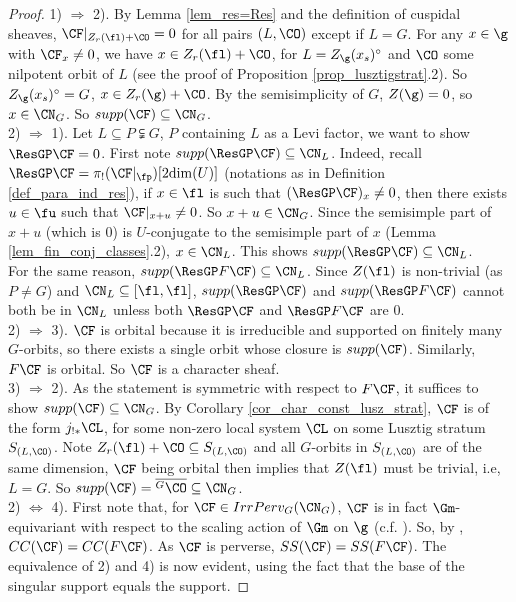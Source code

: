 \begin{proof}
    1) $\Rightarrow$ 2). By Lemma \ref{lem_res=Res} and the definition of cuspidal sheaves, $\CF|_{Z_r(\fl)+\CO}=0$ for all pairs $(L,\CO)$ except if $L=G$. For any $x\in\g$ with $\CF_x\neq 0$, we have $x\in Z_r(\fl)+\CO$, for $L=Z_\g(x_s)^\circ$ and $\CO$ some nilpotent orbit of $L$ (see the proof of Proposition \ref{prop_lusztigstrat}.2). So $Z_\g(x_s)^\circ=G$, $x\in Z_r(\g)+\CO$. By the semisimplicity of $G$, $Z(\g)=0$, so $x\in\CN_G$. So $supp(\CF)\subseteq\CN_G$.\\
    
    2) $\Rightarrow$ 1). Let $L\subseteq P\subsetneqq G$, $P$ containing $L$ as a Levi factor, we want to show $\ResGP\CF=0$. First note $supp(\ResGP\CF)\subseteq \CN_L$. Indeed, recall $\ResGP\CF=\pi_!(\CF|_\fp)[2\mathrm{dim}(U)]$ (notations as in Definition \ref{def_para_ind_res}), if $x\in \fl$ is such that $(\ResGP\CF)_x\neq 0$, then there exists $u\in\fu$ such that $\CF|_{x+u}\neq 0$. So $x+u\in \CN_G$. Since the semisimple part of $x+u$ (which is 0) is $U$-conjugate to the semisimple part of $x$ (Lemma \ref{lem_fin_conj_classes}.2), $x\in \CN_L$. This shows $supp(\ResGP\CF)\subseteq \CN_L$.\\

    For the same reason, $supp(\ResGP F\CF)\subseteq \CN_L$. Since $Z(\fl)$ is non-trivial (as $P\neq G$) and $\CN_L\subseteq [\fl,\fl]$, $supp(\ResGP\CF)$ and $supp(\ResGP F\CF)$ cannot both be in $\CN_L$ unless both $\ResGP\CF$ and $\ResGP F\CF$ are 0.\\
    
    2) $\Rightarrow$ 3). $\CF$ is orbital because it is irreducible and supported on finitely many $G$-orbits, so there exists a single orbit whose closure is $supp(\CF)$. Similarly, $F\CF$ is orbital. So $\CF$ is a character sheaf.\\
    
    3) $\Rightarrow$ 2). As the statement is symmetric with respect to $F\CF$, it suffices to show $supp(\CF)\subseteq \CN_G$. By Corollary \ref{cor_char_const_lusz_strat}, $\CF$ is of the form $j_{!*}\CL$, for some non-zero local system $\CL$ on some Lusztig stratum $S_{(L,\CO)}$. Note $Z_r(\fl)+\CO\subseteq S_{(L,\CO)}$ and all $G$-orbits in $S_{(L,\CO)}$ are of the same dimension, $\CF$ being orbital then implies that $Z(\fl)$ must be trivial, i.e, $L=G$. So $supp(\CF)=\overline{^G\CO}\subseteq \CN_G$. \\
    
    2) $\Leftrightarrow$ 4). First note that, for $\CF\in IrrPerv_G(\CN_G)$, $\CF$ is in fact $\Gm$-equivariant with respect to the scaling action of $\Gm$ on $\g$ (c.f. \cite[.7.3]{achar_perverse_2021}). So, by \cite[]{zhou_fourier_2024}, $CC(\CF)=CC(F\CF)$. As $\CF$ is perverse, $SS(\CF)=SS(F\CF)$. The equivalence of 2) and 4) is now evident, using the fact that the base of the singular support equals the support.

\end{proof}

